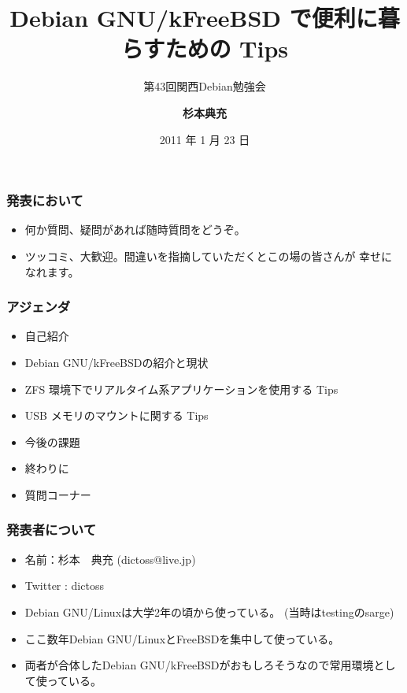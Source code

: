 \documentclass[cjk,dvipdfmx,12pt,%
hyperref={bookmarks=true,bookmarksnumbered=true,bookmarksopen=false,%
colorlinks=false,%
pdftitle={Debian GNU/kFreeBSD で便利に暮らすための Tips},%
pdfauthor={杉本典充},%
pdfsubject={第43回関西Debian勉強会},%
}]{beamer}
\title{Debian GNU/kFreeBSD で便利に暮らすための Tips}
\subtitle{{\scriptsize{第43回関西Debian勉強会}}}
\author[杉本 典充]{{\large\bf 杉本典充}}
\institute[]{{\normalsize\tt dictoss@live.jp}}
\date{{\small 2011 年 1 月 23 日}}
\begin{document}
\settitleslide
\begin{frame}
\titlepage
\end{frame}
\setdefaultslide


\begin{frame}[fragile]
\frametitle{発表において}
\begin{itemize}
  \item 何か質問、疑問があれば随時質問をどうぞ。
  \item ツッコミ、大歓迎。間違いを指摘していただくとこの場の皆さんが
幸せになれます。
\end{itemize}
\end{frame}


\begin{frame}[fragile]
\frametitle{アジェンダ}
\begin{itemize}
  \item 自己紹介
  \item Debian GNU/kFreeBSDの紹介と現状
  \item ZFS 環境下でリアルタイム系アプリケーションを使用する Tips
  \item USB メモリのマウントに関する Tips
  \item 今後の課題
  \item 終わりに
  \item 質問コーナー
\end{itemize}
\end{frame}


\begin{frame}[fragile]
\frametitle{発表者について}
\begin{itemize}
  \item 名前：杉本　典充 (dictoss@live.jp)
  \item Twitter : dictoss
  \item Debian GNU/Linuxは大学2年の頃から使っている。
(当時はtestingのsarge)
  \item ここ数年Debian GNU/LinuxとFreeBSDを集中して使っている。
  \item 両者が合体したDebian GNU/kFreeBSDがおもしろそうなので常用環境として使っている。
\end{itemize}
\end{frame}
\end{document}
